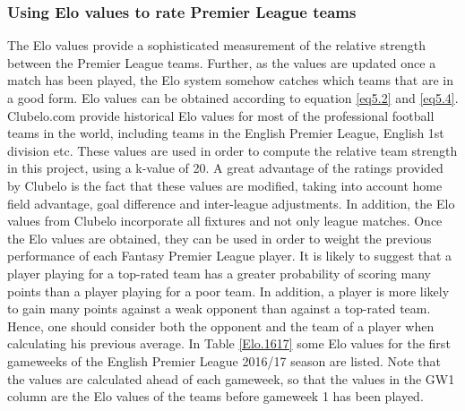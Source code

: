 \subsubsection{Using Elo values to rate Premier League teams}
The Elo values provide a sophisticated measurement of the relative strength between the Premier League teams. Further, as the values are updated once a match has been played, the Elo system somehow catches which teams that are in a good form. Elo values can be obtained according to equation \ref{eq5.2} and \ref{eq5.4}. Clubelo.com provide historical Elo values for most of the professional football teams in the world, including teams in the English Premier League, English 1st division etc. These values are used in order to compute the relative team strength in this project, using a k-value of 20. A great advantage of the ratings provided by Clubelo is the fact that these values are modified, taking into account home field advantage, goal difference and inter-league adjustments. In addition, the Elo values from Clubelo incorporate all fixtures and not only league matches.
\newpar
Once the Elo values are obtained, they can be used in order to weight the previous performance of each Fantasy Premier League player. It is likely to suggest that a player playing for a top-rated team has a greater probability of scoring many points than a player playing for a poor team. In addition, a player is more likely to gain many points against a weak opponent than against a top-rated team. Hence, one should consider both the opponent and the team of a player when calculating his previous average. 
\newpar
In Table \ref{Elo.1617} some Elo values for the first gameweeks of the English Premier League 2016/17 season are listed. Note that the values are calculated ahead of each gameweek, so that the values in the GW1 column are the Elo values of the teams before gameweek 1 has been played. 

